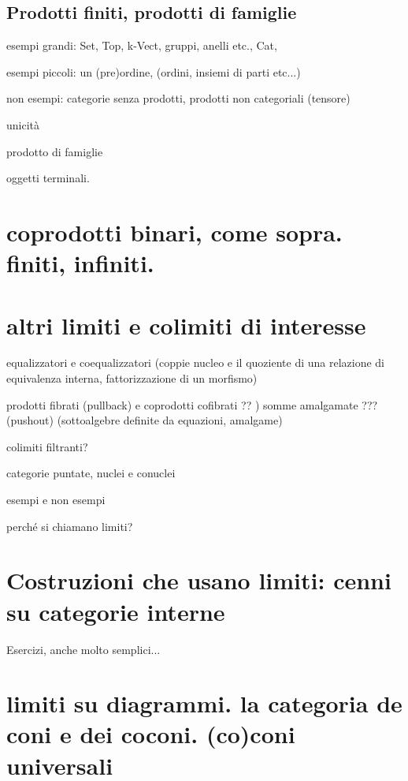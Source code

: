 \subsection{Prodotti finiti, prodotti di famiglie}


\begin{esercizi}
	\item
\end{esercizi}

\bigskip
esempi grandi: Set, Top, k-Vect, gruppi, anelli etc., Cat,

esempi piccoli: un (pre)ordine, (ordini, insiemi di parti etc...)

non esempi: categorie senza prodotti, prodotti non categoriali (tensore)

unicità

prodotto di famiglie

oggetti terminali.

\section{coprodotti binari, come sopra. finiti, infiniti.}

\section{altri limiti e colimiti di interesse}

equalizzatori e coequalizzatori (coppie nucleo e il quoziente di una relazione di equivalenza interna, fattorizzazione di un morfismo)

prodotti fibrati (pullback) e coprodotti cofibrati ?? ) somme amalgamate ??? (pushout) (sottoalgebre definite da equazioni, amalgame)

colimiti filtranti?

categorie puntate, nuclei e conuclei

esempi e non esempi

perché si chiamano limiti?


\section{Costruzioni che usano limiti: cenni su categorie interne}

Esercizi, anche molto semplici...

\section{limiti su diagrammi. la categoria de coni e dei coconi. (co)coni universali}

